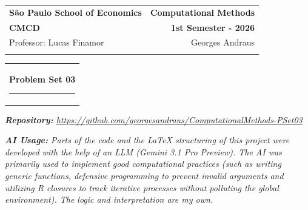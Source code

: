 \documentclass[11pt]{article}
\numberwithin{equation}{section}
\numberwithin{figure}{section}
\begin{document}
\thispagestyle{empty}

\begin{tabular}{p{9.8cm}p{9cm}}
{\large \bf São Paulo School of Economics} & \multicolumn{1}{r}{\large \bf Computational Methods}\\ 
\large{\bf CMCD} & \multicolumn{1}{r}{\large \bf 1st Semester - 2026}\\ 
\large Professor: Lucas Finamor & \multicolumn{1}{r}{\large Georges Andraus} 
\\
\vspace{0.3cm}
\\
\end{tabular}

\begin{tabular}{p{15.5cm}}
\hline
\vspace{-0.3cm}
\center \Large{\textbf{Problem Set 03}} 
\vspace{0.4cm}
\hrule
\vspace{0.55cm}
\end{tabular}

\vspace{1cm}

\noindent\textit{\textbf{Repository:} \url{https://github.com/georgesandraus/ComputationalMethods-PSet03}}

\noindent\textit{\textbf{AI Usage:} Parts of the code and the LaTeX structuring of this project were developed with the help of an LLM (Gemini 3.1 Pro Preview). The AI was primarily used to implement good computational practices (such as writing generic functions, defensive programming to prevent invalid arguments and utilizing R closures to track iterative processes without polluting the global environment). The logic and interpretation are my own.}

\vspace{0.1cm}

\end{document}
